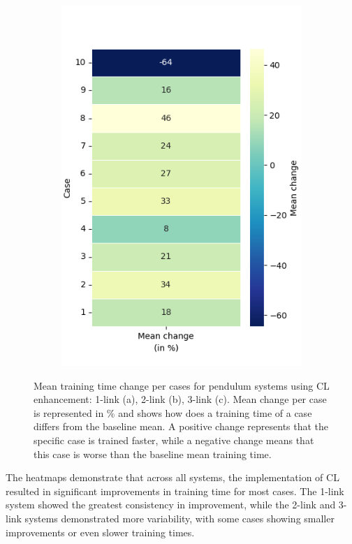 \begin{figure}[h!]
\begin{subfigure}[t]{0.48\textwidth}
		\includegraphics[width=\textwidth]{Figures/TP_mean_heatmap_percentage.png}
		\label{fig: TP_mean}
		\caption{}
	\end{subfigure}
	\hfill
	
	\caption{Mean training time change per cases for pendulum systems using CL enhancement: 1-link (a), 2-link (b), 3-link (c). Mean change per case is represented in \% and shows how does a training time of a case differs from the baseline mean. A positive change represents that the specific case is trained faster, while a negative change means that this case is worse than the baseline mean training time.}
	\label{fig: percentage heatmaps for 1- to 3- link systems using CL}
\end{figure}

The heatmaps demonstrate that across all systems, the implementation of CL resulted in significant improvements in training time for most cases. The 1-link system showed the greatest consistency in improvement, while the 2-link and 3-link systems demonstrated more variability, with some cases showing smaller improvements or even slower training times.

